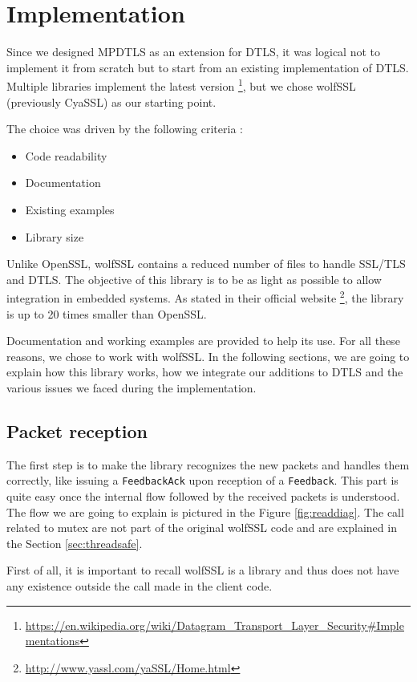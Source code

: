 \chapter{Implementation}\label{chap:implementation}

Since we designed MPDTLS as an extension for DTLS, it was logical not to implement it from scratch but to start from an existing implementation of DTLS. Multiple libraries implement the latest version \footnote{\url{https://en.wikipedia.org/wiki/Datagram_Transport_Layer_Security\#Implementations}}, but we chose wolfSSL \cite{wolfssl} (previously CyaSSL) as our starting point.

The choice was driven by the following criteria :
\begin{itemize}
\item Code readability
\item Documentation
\item Existing examples
\item Library size
\end{itemize}

Unlike OpenSSL, wolfSSL contains a reduced number of files to handle SSL/TLS and DTLS. The objective of this library is to be as light as possible to allow integration in embedded systems. As stated in their official website \footnote{\url{http://www.yassl.com/yaSSL/Home.html}}, the library is up to 20 times smaller than OpenSSL.

Documentation and working examples are provided to help its use. For all these reasons, we chose to work with wolfSSL. In the following sections, we are going to explain how this library works, how we integrate our additions to DTLS and the various issues we faced during the implementation.

\section{Packet reception}\label{sec:packet-reception}
The first step is to make the library recognizes the new packets and handles them correctly, like issuing a \texttt{FeedbackAck} upon reception of a \texttt{Feedback}. This part is quite easy once the internal flow followed by the received packets is understood. The flow we are going to explain is pictured in the Figure \ref{fig:readdiag}. The call related to mutex are not part of the original wolfSSL code and are explained in the Section \ref{sec:threadsafe}.

First of all, it is important to recall wolfSSL is a library and thus does not have any existence outside the call made in the client code.

